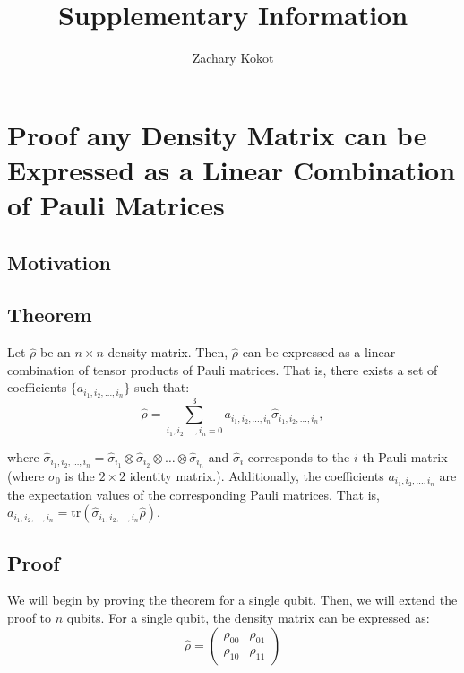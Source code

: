 \documentclass[12pt]{article}
\author{Zachary Kokot}
\title{Supplementary Information}
\begin{document}
    \maketitle

    \tableofcontents

    \newpage

    \section{Proof any Density Matrix can be Expressed as a Linear Combination of Pauli Matrices}
    \subsection{Motivation}
    
    \subsection{Theorem}
    Let $\hat{\rho}$ be an $n \times n$ density matrix. Then, $\hat{\rho}$ can be expressed as a linear combination of tensor products of Pauli matrices. That is, there exists a set of coefficients $\{a_{i_1, i_2, \dots, i_n}\}$ such that:
    \begin{equation}
        \hat{\rho} = \sum_{i_1,i_2,\dots,i_n = 0}^{3} a_{i_1, i_2, \dots, i_n} \hat{\sigma}_{i_1,i_2,\dots,i_n},
    \end{equation}

    where $\hat{\sigma}_{i_1,i_2,\dots,i_n} = \hat{\sigma}_{i_1} \otimes \hat{\sigma}_{i_2} \otimes \dots \otimes \hat{\sigma}_{i_n}$ and $\hat{\sigma}_{i}$ corresponds to the $i$-th Pauli matrix (where $\sigma_0$ is the $2 \times 2$ identity matrix.). Additionally, the coefficients $a_{i_1, i_2, \dots, i_n}$ are the expectation values of the corresponding Pauli matrices. That is, $a_{i_1, i_2, \dots, i_n} = \text{tr}(\hat{\sigma}_{i_1,i_2,\dots,i_n}\hat{\rho})$.

    \subsection{Proof}
    We will begin by proving the theorem for a single qubit. Then, we will extend the proof to $n$ qubits. For a single qubit, the density matrix can be expressed as:
    \begin{equation}
        \hat{\rho} = 
        \begin{pmatrix}
            \rho_{00} & \rho_{01} \\
            \rho_{10} & \rho_{11}
        \end{pmatrix}
    \end{equation}
\end{document}
